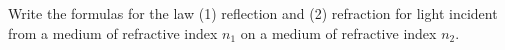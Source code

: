

\vspace*{\fill}
\centering

Write the formulas for the law (1) reflection and (2) refraction for light incident from a medium of refractive index $n_1$ on a medium of refractive index $n_2$.

\centering
\vspace*{\fill}


